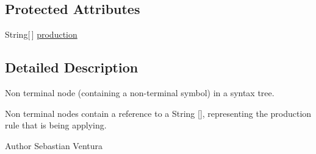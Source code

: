 \subsection*{Protected Attributes}
\begin{DoxyCompactItemize}
\item 
String\mbox{[}$\,$\mbox{]} \hyperlink{classnet_1_1sf_1_1jclec_1_1syntaxtree_1_1_non_terminal_node_a311eab53a59ada8806248ba6ecef14c8}{production}
\end{DoxyCompactItemize}


\subsection{Detailed Description}
Non terminal node (containing a non-\/terminal symbol) in a syntax tree.

Non terminal nodes contain a reference to a String \mbox{[}\mbox{]}, representing the production rule that is being applying.

\begin{DoxyAuthor}{Author}
Sebastian Ventura 
\end{DoxyAuthor}


